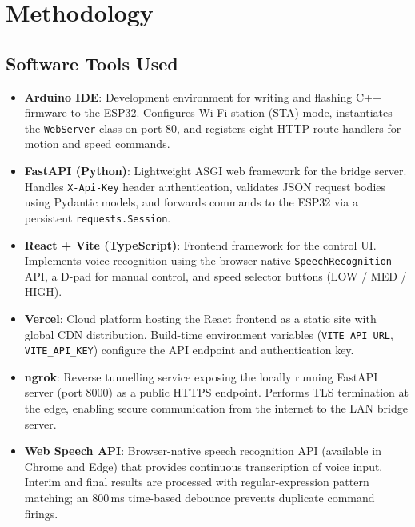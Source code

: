 \documentclass[12pt]{report}
\begin{document}
\chapter{Methodology}

\section{Software Tools Used}

\begin{itemize}
    \item \textbf{Arduino IDE}: Development environment for writing and flashing
          C++ firmware to the ESP32. Configures Wi-Fi station (STA) mode,
          instantiates the \texttt{WebServer} class on port 80, and registers
          eight HTTP route handlers for motion and speed commands.

    \item \textbf{FastAPI (Python)}: Lightweight ASGI web framework for the bridge
          server. Handles \texttt{X-Api-Key} header authentication, validates
          JSON request bodies using Pydantic models, and forwards commands to the
          ESP32 via a persistent \texttt{requests.Session}.

    \item \textbf{React + Vite (TypeScript)}: Frontend framework for the control
          UI. Implements voice recognition using the browser-native
          \texttt{SpeechRecognition} API, a D-pad for manual control, and speed
          selector buttons (LOW / MED / HIGH).

    \item \textbf{Vercel}: Cloud platform hosting the React frontend as a static
          site with global CDN distribution. Build-time environment variables
          (\texttt{VITE\_API\_URL}, \texttt{VITE\_API\_KEY}) configure the API
          endpoint and authentication key.

    \item \textbf{ngrok}: Reverse tunnelling service exposing the locally running
          FastAPI server (port 8000) as a public HTTPS endpoint. Performs TLS
          termination at the edge, enabling secure communication from the
          internet to the LAN bridge server.

    \item \textbf{Web Speech API}: Browser-native speech recognition API
          (available in Chrome and Edge) that provides continuous transcription
          of voice input. Interim and final results are processed with
          regular-expression pattern matching; an 800\,ms time-based debounce
          prevents duplicate command firings.


\end{itemize}
\end{document}
